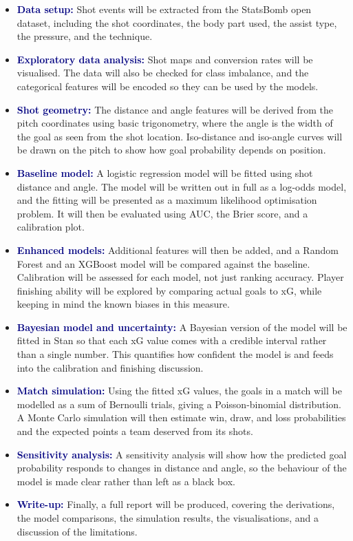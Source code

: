 \documentclass[11pt]{article}
\begin{document}
\begin{itemize}[leftmargin=1.6em,itemsep=5pt]
  \item \textbf{\textcolor{navy}{Data setup:}} Shot events will be extracted from
        the StatsBomb open dataset, including the shot coordinates, the body part
        used, the assist type, the pressure, and the technique.
  \item \textbf{\textcolor{navy}{Exploratory data analysis:}} Shot maps and
        conversion rates will be visualised. The data will also be checked for
        class imbalance, and the categorical features will be encoded so they can
        be used by the models.
  \item \textbf{\textcolor{navy}{Shot geometry:}} The distance and angle features
        will be derived from the pitch coordinates using basic trigonometry,
        where the angle is the width of the goal as seen from the shot location.
        Iso-distance and iso-angle curves will be drawn on the pitch to show how
        goal probability depends on position.
  \item \textbf{\textcolor{navy}{Baseline model:}} A logistic regression model
        will be fitted using shot distance and angle. The model will be written
        out in full as a log-odds model, and the fitting will be presented as a
        maximum likelihood optimisation problem. It will then be evaluated using
        AUC, the Brier score, and a calibration plot.
  \item \textbf{\textcolor{navy}{Enhanced models:}} Additional features will then
        be added, and a Random Forest and an XGBoost model will be compared
        against the baseline. Calibration will be assessed for each model, not
        just ranking accuracy. Player finishing ability will be explored by
        comparing actual goals to xG, while keeping in mind the known biases in
        this measure.
  \item \textbf{\textcolor{navy}{Bayesian model and uncertainty:}} A Bayesian
        version of the model will be fitted in Stan so that each xG value comes
        with a credible interval rather than a single number. This quantifies how
        confident the model is and feeds into the calibration and finishing
        discussion.
  \item \textbf{\textcolor{navy}{Match simulation:}} Using the fitted xG values,
        the goals in a match will be modelled as a sum of Bernoulli trials,
        giving a Poisson-binomial distribution. A Monte Carlo simulation will
        then estimate win, draw, and loss probabilities and the expected points a
        team deserved from its shots.
  \item \textbf{\textcolor{navy}{Sensitivity analysis:}} A sensitivity analysis
        will show how the predicted goal probability responds to changes in
        distance and angle, so the behaviour of the model is made clear rather
        than left as a black box.
  \item \textbf{\textcolor{navy}{Write-up:}} Finally, a full report will be
        produced, covering the derivations, the model comparisons, the simulation
        results, the visualisations, and a discussion of the limitations.
\end{itemize}
\end{document}
